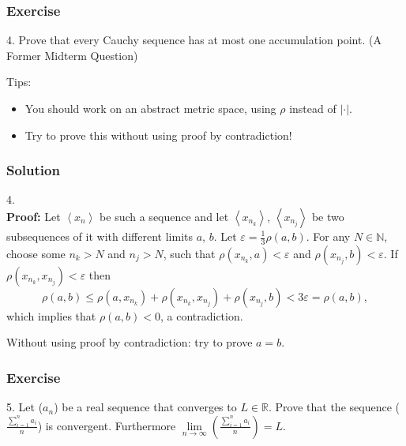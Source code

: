 \documentclass{beamer}
\begin{document}
        \begin{frame}
            \frametitle{Exercise}
            4. Prove that every Cauchy sequence has at most one accumulation point.
            (A Former Midterm Question)
            
            \vspace{2em}
            Tips:
            \begin{itemize}
                \item You should work on an abstract metric space, using $\rho $ instead of $| \cdot |$.
                \item Try to prove this without using proof by contradiction!
            \end{itemize}
        \end{frame}
    \begin{frame}
        \frametitle{Solution}
        4.\\
        \textbf{Proof:} Let $\left < x_n \right >$ be such a sequence and let $\left < x_{n_k} \right >$, $\left < x_{n_j} \right >$ be two subsequences of it with different limits $a$, $b$. 
        Let $\varepsilon = \frac{1}{3} \rho(a, b)$. For any $N \in \mathbb{N}$, choose some $n_k > N$ and $n_j > N$, 
        such that $\rho(x_{n_k}, a) < \varepsilon$ and $\rho(x_{n_j}, b) < \varepsilon$. If $\rho(x_{n_k}, x_{n_j}) < \varepsilon$ then 
    \begin{equation*}
        \rho(a, b) \leq \rho(a, x_{n_k}) + \rho(x_{n_k}, x_{n_j}) + \rho(x_{n_j}, b) < 3 \varepsilon = \rho(a, b),  
    \end{equation*} 
    which implies that $\rho(a, b) < 0$, a contradiction. 
        
    \vspace{2em}
    Without using proof by contradiction: try to prove $a=b$.
    \end{frame}
    \begin{frame}
        \frametitle{Exercise}
        5. Let ($a_n$) be a real sequence that converges to $L \in \mathbb{R}$.
        Prove that the sequence ($\frac{\sum_{i=1}^n a_i}{n}$) is convergent. 
        Furthermore $\underset{n\rightarrow \infty}{\lim} (\frac{\sum_{i=1}^n a_i}{n})=L $.
    \end{frame}
\end{document}
